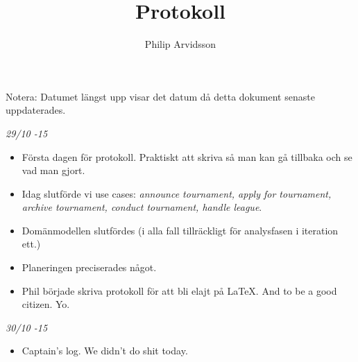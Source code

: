 \documentclass{article}
\title{Protokoll}
\author{Philip Arvidsson}
\begin{document}
    \maketitle

    Notera: Datumet längst upp visar det datum då detta dokument senaste
            uppdaterades.

    \vspace{1.5cm}

    {\large \textit{29/10 -15}}
    \begin{itemize}
      \item Första dagen för protokoll. Praktiskt att skriva så man kan
            gå tillbaka och se vad man gjort.

      \item Idag slutförde vi use cases: \textit{announce tournament,
            apply for tournament, archive tournament, conduct
            tournament, handle league}.

      \item Domänmodellen slutfördes (i alla fall tillräckligt för
            analysfasen i iteration ett.)

      \item Planeringen preciserades något.

      \item Phil började skriva protokoll för att bli elajt på LaTeX.
            And to be a good citizen. Yo.
    \end{itemize}

    {\large \textit{30/10 -15}}
    \begin{itemize}
      \item Captain's log. We didn't do shit today.
    \end{itemize}
\end{document}
